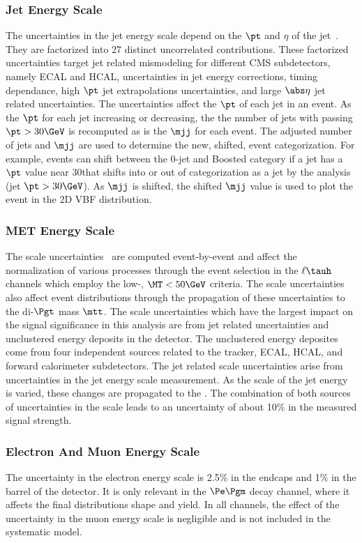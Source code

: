 \subsubsection{Jet Energy Scale}
The uncertainties in the jet energy scale depend on the $\pt$ and $\eta$ of the jet~\cite{CMS-JME-10-011}.
They are factorized into 27 distinct uncorrelated contributions. These factorized uncertainties target jet related 
mismodeling for different CMS subdetectors, namely ECAL and HCAL, uncertainties in jet energy corrections, timing dependance,
high $\pt$ jet extrapolations uncertainties, and large $\abs\eta$ jet related uncertainties. The uncertainties
affect the $\pt$ of each jet in an event. As the $\pt$ for each jet increasing or decreasing, the 
the number of jets with passing $\pt > 30\GeV$ is recomputed as is the $\mjj$ for each event. The adjusted number of
jets and $\mjj$ are used to determine the new, shifted, event categorization. For example,
events can shift between the 0-jet and Boosted category if a jet has a $\pt$ value near 30\GeV that shifts into
or out of categorization as a jet by the analysis (jet $\pt > 30\GeV$). As $\mjj$ is shifted, the shifted $\mjj$ value is used
to plot the event in the 2D VBF distribution.


\subsubsection{MET Energy Scale}
The \etvecmiss scale uncertainties~\cite{CMS-JME-12-002} are computed event-by-event and affect the normalization of 
various processes through the event selection in the $\ell\tauh$ channels which employ the low-\MT,
$\MT < 50\GeV$ criteria. The \etvecmiss scale uncertainties also affect event distributions through the 
propagation of these uncertainties 
to the di-$\Pgt$ mass $\mtt$. The \etvecmiss scale uncertainties which have the largest impact on the signal significance
in this analysis are from jet related uncertainties and unclustered energy deposits in the detector.
The unclustered energy deposites come from four independent sources related to the tracker, ECAL, HCAL, and 
forward calorimeter subdetectors. The jet related \etvecmiss scale uncertainties arise from uncertainties
in the jet energy scale measurement. As the scale of the jet energy is varied, these changes are propagated to
the \etvecmiss. The combination of both sources of uncertainties in 
the \etvecmiss scale leads to an uncertainty of about 10\% in the measured signal strength.


\subsubsection{Electron And Muon Energy Scale}
The uncertainty in the electron energy scale is 2.5\% in the endcaps and 1\% in the barrel of the detector. 
It is only relevant in the $\Pe\Pgm$ decay channel, where it affects the final distributions shape and yield.
In all channels, the effect of the uncertainty in the muon energy scale is negligible and is not included
in the systematic model.


